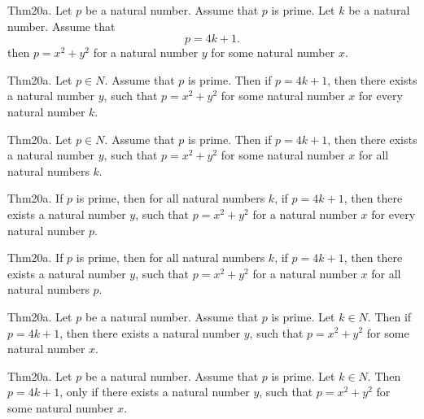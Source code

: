 \documentclass{article}
\begin{document}
Thm20a. Let $p$ be a natural number. Assume that $p$ is prime. Let $k$ be a natural number. Assume that $$p = 4 k + 1.$$ then $p = x ^{ 2}+ y ^{ 2}$ for a natural number $y$ for some natural number $x$.

Thm20a. Let $p \in N$. Assume that $p$ is prime. Then if $p = 4 k + 1$, then there exists a natural number $y$, such that $p = x ^{ 2}+ y ^{ 2}$ for some natural number $x$ for every natural number $k$.

Thm20a. Let $p \in N$. Assume that $p$ is prime. Then if $p = 4 k + 1$, then there exists a natural number $y$, such that $p = x ^{ 2}+ y ^{ 2}$ for some natural number $x$ for all natural numbers $k$.

Thm20a. If $p$ is prime, then for all natural numbers $k$, if $p = 4 k + 1$, then there exists a natural number $y$, such that $p = x ^{ 2}+ y ^{ 2}$ for a natural number $x$ for every natural number $p$.

Thm20a. If $p$ is prime, then for all natural numbers $k$, if $p = 4 k + 1$, then there exists a natural number $y$, such that $p = x ^{ 2}+ y ^{ 2}$ for a natural number $x$ for all natural numbers $p$.

Thm20a. Let $p$ be a natural number. Assume that $p$ is prime. Let $k \in N$. Then if $p = 4 k + 1$, then there exists a natural number $y$, such that $p = x ^{ 2}+ y ^{ 2}$ for some natural number $x$.

Thm20a. Let $p$ be a natural number. Assume that $p$ is prime. Let $k \in N$. Then $p = 4 k + 1$, only if there exists a natural number $y$, such that $p = x ^{ 2}+ y ^{ 2}$ for some natural number $x$.
\end{document}
